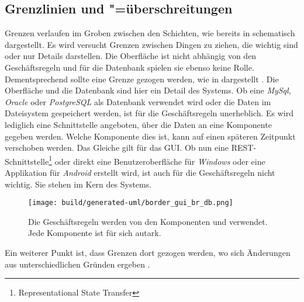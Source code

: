 \subsection{Grenzlinien und "=überschreitungen}
\label{sec:grenzen}

Grenzen verlaufen im Groben zwischen den Schichten, wie bereits in  schematisch dargestellt. Es wird versucht Grenzen zwischen Dingen zu ziehen, die wichtig sind oder nur Details darstellen. Die Oberfläche ist nicht abhängig von den Geschäftsregeln und für die Datenbank spielen sie ebenso keine Rolle. Dementsprechend sollte eine Grenze gezogen werden, wie \zb in  dargestellt \citep[vgl.][165\psq]{martin2018}. Die Oberfläche und die Datenbank sind hier ein Detail des Systems. Ob eine \textit{MySql}, \textit{Oracle} oder \textit{PostgreSQL} als Datenbank verwendet wird oder die Daten im Dateisystem gespeichert werden, ist für die Geschäftsregeln unerheblich. Es wird lediglich eine Schnittstelle angeboten, über die Daten an eine Komponente gegeben werden. Welche Komponente dies ist, kann auf einen späteren Zeitpunkt verschoben werden. Das Gleiche gilt für das \ac{GUI}. Ob nun eine REST-Schnittstelle\footnote{Representational State Transfer} oder direkt eine Benutzeroberfläche für \textit{Windows} oder eine Applikation für \textit{Android} erstellt wird, ist auch für die Geschäftsregeln nicht wichtig. Sie stehen im Kern des Systems. 

\begin{figure}
  \centering
  \texttt{[image: build/generated-uml/border\_gui\_br\_db.png]}
   \caption{Die Geschäftsregeln werden von den Komponenten  und  verwendet. Jede Komponente ist für sich autark.}
   \label{fig:border_gui_br_db}
\end{figure}


Ein weiterer Punkt ist, dass Grenzen dort gezogen werden, wo sich Änderungen aus unterschiedlichen Gründen ergeben \citep[vgl.][173]{martin2018}.


